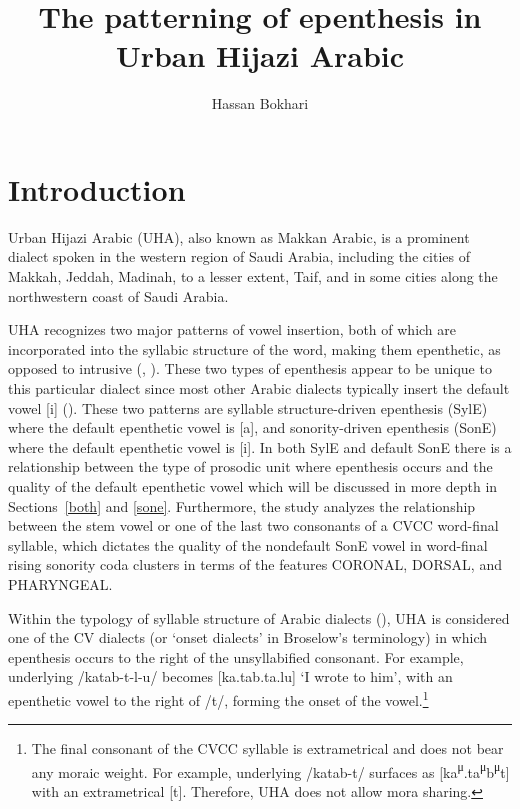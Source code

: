 \documentclass[output=paper,colorlinks,citecolor=brown]{langscibook}
\author{Hassan Bokhari}\affiliation{Indiana University}
\title{The patterning of epenthesis in Urban Hijazi Arabic}
\begin{document}
\maketitle \label{ch4}

\section{Introduction} 
Urban Hijazi Arabic (UHA), also known as Makkan Arabic, is a prominent dialect spoken in the western region of Saudi Arabia, including the cities of Makkah, Jeddah, Madinah, to a lesser extent, Taif, and in some cities along the northwestern coast of Saudi Arabia.

UHA recognizes two major patterns of vowel insertion, both of which are incorporated into the syllabic structure of the word, making them epenthetic, as opposed to intrusive (, ). These two types of epenthesis appear to be unique to this particular dialect since most other Arabic dialects typically insert the default vowel [i] (\cite[102]{Farwaneh2017}). These two patterns are syllable structure-driven epenthesis (SylE) where the default epenthetic vowel is [a], and sonority-driven epenthesis (SonE) where the default epenthetic vowel is [i]. In both SylE and default SonE there is a relationship between the type of prosodic unit where epenthesis occurs and the quality of the default epenthetic vowel which will be discussed in more depth in Sections~\ref{both} and \ref{sone}. Furthermore, the study analyzes the relationship between the stem vowel or one of the last two consonants of a CVCC word-final syllable, which dictates the quality of the nondefault SonE vowel in word-final rising sonority coda clusters in terms of the features CORONAL, DORSAL, and PHARYNGEAL.

Within the typology of syllable structure of Arabic dialects (\cite{Kiparsky2003, Watson2007, Broselow2018}), UHA is considered one of the CV dialects (or ‘onset dialects’ in Broselow’s terminology) in which epenthesis occurs to the right of the unsyllabified consonant. For example, underlying /katab{}-t-l-u/ becomes [ka.tab.ta.lu] ‘I wrote to him’, with an epenthetic vowel to the right of /t/, forming the onset of the vowel.\footnote{{The final consonant of the CVCC syllable is extrametrical and does not bear any moraic weight. For example, underlying /katab{}-t/ surfaces as [ka}{\textsuperscript{μ}}{.ta}{\textsuperscript{μ}}{b}{\textsuperscript{μ}}{t] with an extrametrical [t]. Therefore, UHA does not allow mora sharing.} }
\end{document}
